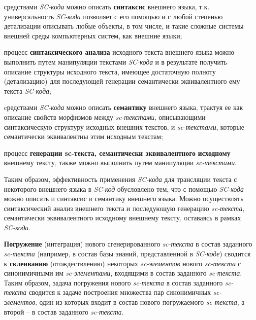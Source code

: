 \begin{SCn}
{\begin{scnitemize}
    \item средствами \textit{SC-кода} можно описать \textbf{синтаксис} внешнего языка, т.к. универсальность \textit{SC-кода} позволяет с его помощью и с любой степенью детализации описывать любые объекты, в том числе, и такие сложные системы внешней среды компьютерных систем, как внешние языки;
    \item процесс \textbf{синтаксического анализа} исходного текста внешнего языка можно выполнить путем манипуляции текстами \textit{SC-кода} и в результате получить описание структуры исходного текста, имеющее достаточную полноту (детализацию) для последующей генерации семантически эквивалентного ему текста \textit{SC-кода};
    \item cредствами \textit{SC-кода} можно описать \textbf{семантику} внешнего языка, трактуя ее как описание свойств морфизмов между \textit{sc-текстами}, описывающими синтаксическую структуру исходных внешних текстов, и \textit{sc-текстами}, которые семантически эквивалентны этим исходным текстам;
    \item процесс \textbf{генерации sc-текста, семантически эквивалентного исходному} внешнему тексту, также можно выполнить путем манипуляции \textit{sc-текстами}.
\end{scnitemize}

Таким образом, эффективность применения \textit{SC-кода} для трансляции текста с некоторого внешнего языка в \textit{SC-код} обусловлено тем, что с помощью \textit{SC-кода} можно описать и синтаксис и семантику внешнего языка. Можно осуществлять синтаксический анализ внешнего текста и последующую генерацию \textit{sc-текста}, семантически эквивалентного исходному внешнему тексту, оставаясь в рамках \textit{SC-кода}.

\textbf{Погружение} (интеграция) нового сгенерированного \textit{sc-текста} в состав заданного \textit{sc-текста} (например, в состав базы знаний, представленной в \textit{SC-коде}) сводится к \textbf{склеиванию} (отождествлению) некоторых \textit{sc-элементов} нового \textit{sc-текста} с синонимичными им \textit{sc-элементами}, входящими в состав заданного\textit{ sc-текста}. Таким образом, задача погружения нового \textit{sc-текста} в состав заданного \textit{sc-текста} сводится к задаче построения множества пар синонимичных \textit{sc-элементов}, один из которых входит в состав нового погружаемого \textit{sc-текста}, а второй -- в состав заданного \textit{sc-текста}.

}
\end{SCn}
